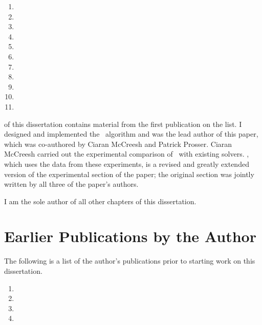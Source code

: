 \begin{enumerate}
    \item{}
    \item{}
    \item{}
    \item{}
    \item{}
    \item{}
    \item{}
    \item{}
    \item{}
    \item{}
    \item{}
\end{enumerate}

 of this dissertation contains material from the
first publication on the list.  I designed and implemented the \McSplit\
algorithm and was the lead author of this paper, which was
co-authored by Ciaran McCreesh and Patrick Prosser.
Ciaran McCreesh carried out the experimental comparison of \McSplit\ with
existing solvers.  \Cref{sec:mcsplit-experiments}, which uses the data from these
experiments, is a revised and greatly extended version of the experimental
section of the paper; the original section was jointly written by all three
of the paper's authors.

I am the sole author of all other chapters of this dissertation.

\section{Earlier Publications by the Author}

The following is a list of the author's publications prior to starting
work on this dissertation.

\begin{enumerate}
    \item{}
    \item{}
    \item{}
    \item{}
\end{enumerate}

